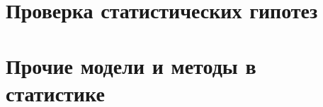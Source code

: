 \documentclass[12pt, a4paper, num=]{tools/listok}
\begin{document}
\part{Проверка статистических гипотез}







\newpage
\part{Прочие модели и методы в статистике}




\newpage


\end{document}
